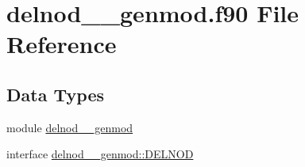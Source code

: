 \hypertarget{delnod____genmod_8f90}{\section{delnod\+\_\+\+\_\+genmod.\+f90 File Reference}
\label{delnod____genmod_8f90}
}
\subsection*{Data Types}
\begin{DoxyCompactItemize}
\item 
module \hyperlink{classdelnod____genmod}{delnod\+\_\+\+\_\+genmod}
\item 
interface \hyperlink{interfacedelnod____genmod_1_1DELNOD}{delnod\+\_\+\+\_\+genmod\+::\+D\+E\+L\+N\+O\+D}
\end{DoxyCompactItemize}
